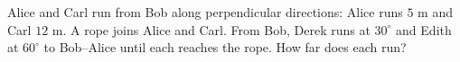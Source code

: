 Alice and Carl run from Bob along perpendicular directions: Alice runs $5$ m and Carl $12$ m. A rope joins Alice and Carl. From Bob, Derek runs at $30^\circ$ and Edith at $60^\circ$ to Bob--Alice until each reaches the rope. How far does each run?
